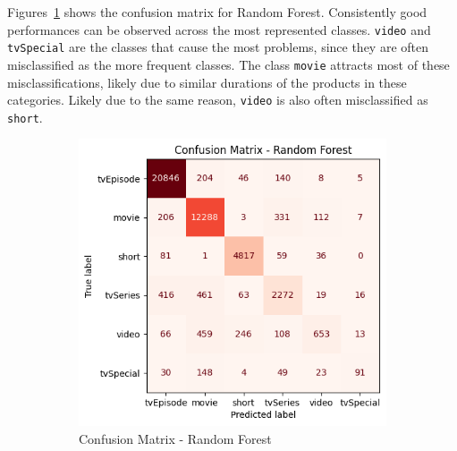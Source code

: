 Figures~\ref{fig:cm_rf_titletype} shows the confusion matrix
for Random Forest.
Consistently good performances can be observed across the most
represented classes. \texttt{video} and \texttt{tvSpecial} are the
classes that cause the most problems, since they are often
misclassified as the more frequent classes. The class \texttt{movie}
attracts most of these misclassifications, likely due to
similar durations of the products in these categories.
Likely due to the same reason, \texttt{video} is also often
misclassified as \texttt{short}.\\

\begin{figure}[H]
    \centering
    \begin{subfigure}[b]{0.47\textwidth}
        \centering
        \includegraphics[width=\textwidth]{plotsss/conf_matr_rf_titletype}
        \caption{Confusion Matrix - Random Forest}
        \label{fig:cm_rf_titletype}
    \end{subfigure}
    \hfill
    \begin{subfigure}[b]{0.50\textwidth}
        \centering

\end{subfigure}
\end{figure}
